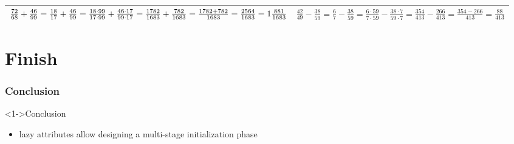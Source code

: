 \documentclass[ngerman,xcolor={table,dvipsnames},smaller,compress,hyperref={bookmarks,colorlinks}]{beamer}
\begin{document}
\begin{frame}[t,fragile]
\begin{block}
\begin{longtable}[l]{p{5.5cm}|p{5.5cm}}
$ \frac{72}{68} + \frac{46}{99} = \frac{18}{17} + \frac{46}{99} = \frac{18 \cdot 99}{17 \cdot 99} + \frac{46 \cdot 17}{99 \cdot 17} = \frac{1782}{1683} + \frac{782}{1683} = \frac{1782 + 782}{1683} = \frac{2564}{1683} = \normalsize{1} \frac{881}{1683} $ & $ \frac{42}{49} - \frac{38}{59} = \frac{6}{7} - \frac{38}{59} = \frac{6 \cdot 59}{7 \cdot 59} - \frac{38 \cdot 7}{59 \cdot 7} = \frac{354}{413} - \frac{266}{413} = \frac{354 - 266}{413} = \frac{88}{413} $                                              \\
\bottomrule
\end{longtable}

\end{block}

\end{frame}

\part{Finish}

\section{Conclusion}

\begin{frame}[t,fragile]

\begin{block}<1->{Conclusion}
\begin{itemize}
\item lazy attributes allow designing a multi-stage initialization phase
\begin{itemize}
\end{itemize}
\end{itemize}
\end{block}

\end{frame}
\end{document}
